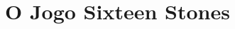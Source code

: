 \documentclass[a4paper]{article}
\begin{document}

\newpage

%
%
%
%
%
%
%



\tableofcontents

\newpage


\section{O Jogo Sixteen Stones}
\end{document}
